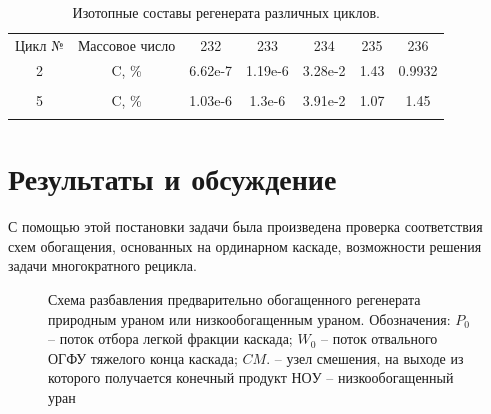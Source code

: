 \begin{table}[h]
  \centering
  \normalsize\begin{tabulary}{1.0\textwidth}{CCCCCCC}
  Цикл № & Массовое число & 232 & 233 & 234 & 235 & 236 \\
  2 & C, \% & 6.62e-7 & 1.19e-6 &    3.28e-2 & 1.43 & 0.9932 \\
   &  &  &  &  &  &  \\
  5 & C, \% &  1.03e-6 &   1.3e-6 &  3.91e-2 & 1.07 & 1.45 \\
   &  &  &  &  &  &  \\
  \end{tabulary}
  \caption{{Изотопные составы регенерата различных циклов.{\label{is_compositions_2_5}}}}
\end{table}

\section{Результаты и обсуждение}

С помощью этой постановки задачи была произведена проверка соответствия схем обогащения, основанных на ординарном каскаде, возможности решения задачи многократного рецикла.

\begin{figure}[ht]
  \caption{Схема разбавления предварительно обогащенного регенерата природным ураном или низкообогащенным ураном. Обозначения: $P_0$ -- поток отбора легкой фракции каскада; $W_0$ -- поток отвального ОГФУ тяжелого конца каскада; $CM.$ -- узел смешения, на выходе из которого получается конечный продукт $НОУ$ -- низкообогащенный уран}\label{o1}
\end{figure}


